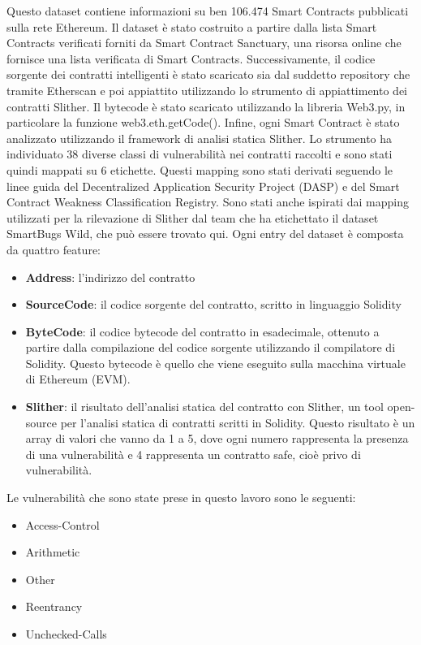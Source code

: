 \documentclass[../../Thesis.tex]{subfiles}
\begin{document}
Questo dataset contiene informazioni su ben 106.474 Smart Contracts pubblicati sulla rete Ethereum. Il dataset è stato costruito a partire dalla lista Smart Contracts verificati forniti da Smart Contract Sanctuary, una risorsa online che fornisce una lista verificata di Smart Contracts. Successivamente, il codice sorgente dei contratti intelligenti è stato scaricato sia dal suddetto repository che tramite Etherscan e poi appiattito utilizzando lo strumento di appiattimento dei contratti Slither. Il bytecode è stato scaricato utilizzando la libreria Web3.py, in particolare la funzione web3.eth.getCode(). Infine, ogni Smart Contract è stato analizzato utilizzando il framework di analisi statica Slither. Lo strumento ha individuato 38 diverse classi di vulnerabilità nei contratti raccolti e sono stati quindi mappati su 6 etichette. Questi mapping sono stati derivati seguendo le linee guida del Decentralized Application Security Project (DASP) e del Smart Contract Weakness Classification Registry. Sono stati anche ispirati dai mapping utilizzati per la rilevazione di Slither dal team che ha etichettato il dataset SmartBugs Wild, che può essere trovato qui. Ogni entry del dataset è composta da quattro feature:
\begin{itemize}
    \item  \textbf{Address}: l'indirizzo del contratto
    \item  \textbf{SourceCode}: il codice sorgente del contratto, scritto in linguaggio Solidity
    \item  \textbf{ByteCode}: il codice bytecode del contratto in esadecimale, ottenuto a partire dalla compilazione del codice sorgente utilizzando il compilatore di Solidity. Questo bytecode è quello che viene eseguito sulla macchina virtuale di Ethereum (EVM).
    \item  \textbf{Slither}: il risultato dell'analisi statica del contratto con Slither, un tool open-source per l'analisi statica di contratti scritti in Solidity. Questo risultato è un array di valori che vanno da 1 a 5, dove ogni numero  rappresenta la presenza di una vulnerabilità e 4 rappresenta un contratto safe, cioè privo di vulnerabilità.
\end{itemize}
Le vulnerabilità che sono state prese in questo lavoro sono le seguenti:
\begin{itemize}
    \item Access-Control
    \item Arithmetic
    \item Other
    \item Reentrancy
    \item Unchecked-Calls
\end{itemize}
 
\end{document}
